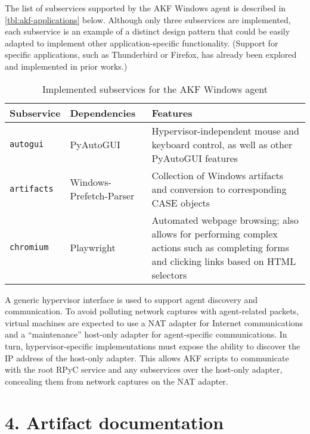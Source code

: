 The list of subservices supported by the AKF Windows agent is described
in \autoref{tbl:akf-applications} below. Although only three subservices
are implemented, each subservice is an example of a distinct design
pattern that could be easily adapted to implement other
application-specific functionality. (Support for specific applications,
such as Thunderbird or Firefox, has already been explored and
implemented in prior works.)


\begin{table}[t]
\centering
\begin{tabular}{l l l}
  \textbf{Subservice} & \textbf{Dependencies} & \textbf{Features} \\ \hline
  \passthrough{\lstinline!autogui!} & PyAutoGUI
  \cite{sweigartAsweigartPyautogui2025a} & Hypervisor-independent
  mouse and keyboard control, as well as other PyAutoGUI features \\
  \passthrough{\lstinline!artifacts!} & Windows-Prefetch-Parser
  \cite{wittPoorBillionaireWindowsPrefetchParser2025} & Collection of
  Windows artifacts and conversion to corresponding CASE objects \\
  \passthrough{\lstinline!chromium!} & Playwright
  \cite{MicrosoftPlaywrightpython2025} & Automated webpage browsing;
  also allows for performing complex actions such as completing forms and
  clicking links based on HTML selectors \\
\end{tabular}
\caption{Implemented subservices for the AKF Windows agent}\label{tbl:akf-applications}
\end{table}


A generic hypervisor interface is used to support agent discovery and
communication. To avoid polluting network captures with agent-related
packets, virtual machines are expected to use a NAT adapter for Internet
communications and a ``maintenance'' host-only adapter for
agent-specific communications. In turn, hypervisor-specific
implementations must expose the ability to discover the IP address of
the host-only adapter. This allows AKF scripts to communicate with the
root RPyC service and any subservices over the host-only adapter,
concealing them from network captures on the NAT adapter.

\section{4. Artifact documentation}\label{artifact-documentation}

